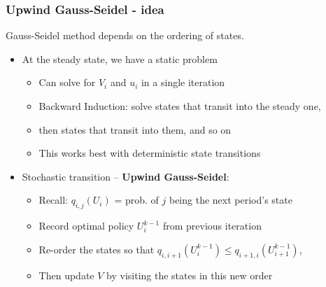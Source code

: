 \documentclass[bigger,handout]{beamer}
\begin{document}
\begin{frame}%

\frametitle{Upwind Gauss-Seidel - idea}

Gauss-Seidel method depends on the ordering of states.

\begin{itemize}
\item At the steady state, we have a static problem

\begin{itemize}
\item Can solve for $V_{i}$ and $u_{i}$ in a single iteration

\item Backward Induction: solve states that transit \newline
into the steady one,

\item then states that transit into them, and so on

\item This works best with deterministic state transitions
\end{itemize}

\item Stochastic transition -- \textbf{Upwind Gauss-Seidel}:

\begin{itemize}
\item Recall: $q_{i,j}(U_{i})$ = prob. of $j$ being the next period's state

\item Record optimal policy $U_{i}^{k-1}$ from previous iteration

\item Re-order the states so that $q_{i,i+1}(U_{i}^{k-1})\leq
q_{i+1,i}(U_{i+1}^{k-1})$,

\item Then update $V$ by visiting the states in this new order
\end{itemize}
\end{itemize}



\end{frame}%
\end{document}
